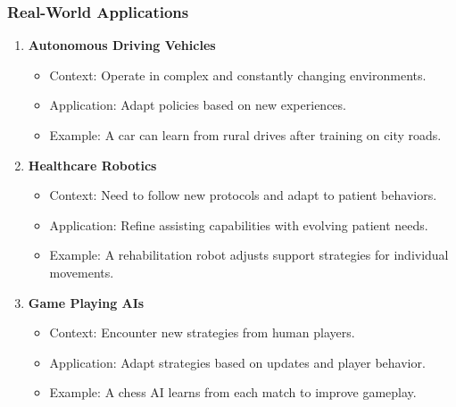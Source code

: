 \documentclass[aspectratio=169]{beamer}
\begin{document}
\begin{frame}[fragile]
    \frametitle{Real-World Applications}
    \begin{enumerate}
        \item \textbf{Autonomous Driving Vehicles}
            \begin{itemize}
                \item Context: Operate in complex and constantly changing environments.
                \item Application: Adapt policies based on new experiences.
                \item Example: A car can learn from rural drives after training on city roads.
            \end{itemize}

        \item \textbf{Healthcare Robotics}
            \begin{itemize}
                \item Context: Need to follow new protocols and adapt to patient behaviors.
                \item Application: Refine assisting capabilities with evolving patient needs.
                \item Example: A rehabilitation robot adjusts support strategies for individual movements.
            \end{itemize}

        \item \textbf{Game Playing AIs}
            \begin{itemize}
                \item Context: Encounter new strategies from human players.
                \item Application: Adapt strategies based on updates and player behavior.
                \item Example: A chess AI learns from each match to improve gameplay.
            \end{itemize}
    \end{enumerate}
\end{frame}
\end{document}
